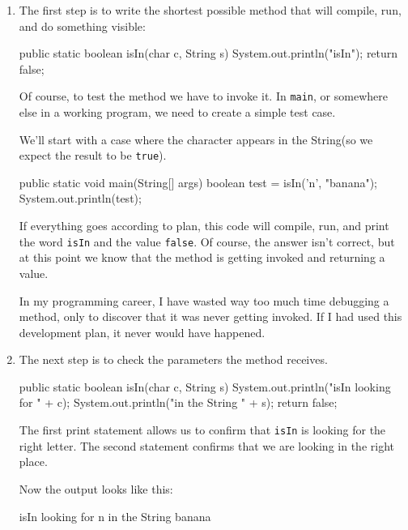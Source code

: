 \documentclass{book}
\begin{document}
\begin{enumerate}

\item The first step is to write the shortest possible method
that will compile, run, and do something visible:

\begin{verbatimtab}
public static boolean isIn(char c, String s) {
    System.out.println("isIn");
    return false;
}
\end{verbatimtab}

Of course, to test the method we have to invoke it.  In
{\tt main}, or somewhere else in a working program, we need
to create a simple test case.

We'll start with a case where the character appears in the
String(so we expect the result to be {\tt true}).

\begin{verbatimtab}
public static void main(String[] args) {
    boolean test = isIn('n', "banana");
    System.out.println(test);
}
\end{verbatimtab}

If everything goes according to plan, this code will compile,
run, and print the word {\tt isIn} and the value {\tt false}.
Of course, the answer isn't correct, but at this point we know
that the method is getting invoked and returning a value.

In my programming career, I have wasted way too much time debugging
a method, only to discover that it was never getting invoked.
If I had used this development plan, it never would have happened.

\item The next step is to check the parameters the method
receives.

\begin{verbatimtab}
public static boolean isIn(char c, String s) {
    System.out.println("isIn looking for " + c);
    System.out.println("in the String " + s);
    return false;
}
\end{verbatimtab}

The first print statement allows us to confirm that {\tt isIn}
is looking for the right letter.  The second statement confirms
that we are looking in the right place.

Now the output looks like this:

\begin{verbatimtab}
isIn looking for n
in the String banana
\end{verbatimtab}


\end{enumerate}
\end{document}
